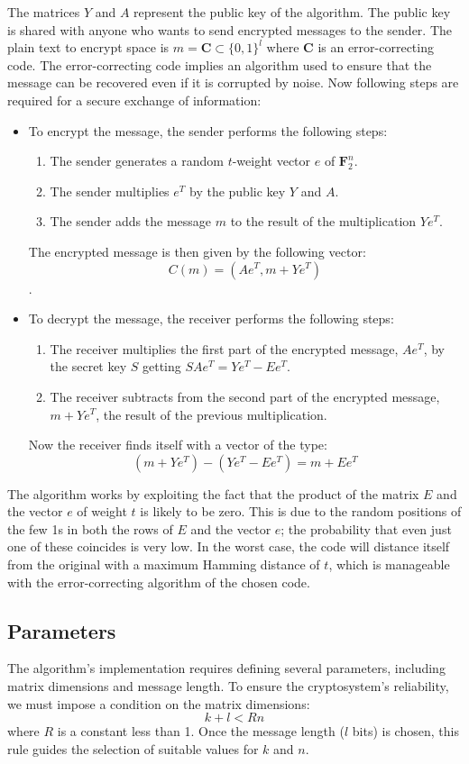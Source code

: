 The matrices $Y$ and $A$ represent the public key of the algorithm. The public key is shared with anyone who wants to send encrypted messages to the sender.
The plain text to encrypt space is $m = \mathbf{C} \subset \{0,1\}^l $ where $\mathbf{C}$ is an error-correcting code. The error-correcting code implies an algorithm used to ensure that the message can be recovered even if it is corrupted by noise.
Now following steps are required for a secure exchange of information:
\begin{itemize}
 \item To encrypt the message, the sender performs the following steps:
    \begin{enumerate}
     \item The sender generates a random $t$-weight vector $e$ of $\mathbf{F}_2^n $.
     \item The sender multiplies $e^T$ by the public key $Y$ and $A$.
     \item The sender adds the message $m$ to the result of the multiplication $Ye^T$.
    \end{enumerate}
    The encrypted message is then given by the following vector: $$C(m) = (Ae^T, m+Ye^T)$$.
    \item To decrypt the message, the receiver performs the following steps:
    \begin{enumerate}
     \item The receiver multiplies the first part of the encrypted message, $Ae^T$, by the secret key $S$ getting $SAe^T = Ye^T-Ee^T $.
     \item The receiver subtracts from the second part of the encrypted message, $m+Ye^T$, the result of the previous multiplication.
    \end{enumerate}
    Now the receiver finds itself with a vector of the type: $$(m+Ye^T) - (Ye^T-Ee^T) = m + Ee^T$$
\end{itemize}
The algorithm works by exploiting the fact that the product of the matrix $E$ and the vector $e$ of weight $t$ is likely to be zero. This is due to the random positions of the few 1s in both the rows of $E$ and the vector $e$; the probability that even just one of these coincides is very low.
In the worst case, the code will distance itself from the original with a maximum Hamming distance of $t$, which is manageable with the error-correcting algorithm of the chosen code.

\subsection{Parameters}
The algorithm's implementation requires defining several parameters, including matrix dimensions and message length. To ensure the cryptosystem's reliability, we must impose a condition on the matrix dimensions: $$k + l < Rn$$ where $R$ is a constant less than 1. Once the message length ($l$ bits) is chosen, this rule guides the selection of suitable values for $k$ and $n$.

